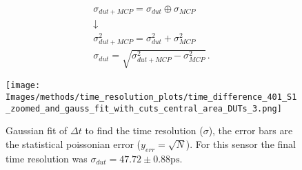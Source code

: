 \begin{equation*}
    \begin{gathered}
    \sigma_{dut+MCP} = \sigma_{dut} \oplus \sigma_{MCP} \\
    \downarrow \\
    \sigma_{dut+MCP}^2 = \sigma_{dut}^2 + \sigma_{MCP}^2 \\
    \sigma_{dut} = \sqrt{\sigma_{dut+MCP}^2-\sigma_{MCP}^2}  \, .
    \end{gathered}
\end{equation*}


\begin{figure}[h!tbp]
    \centering
    \texttt{[image: Images/methods/time\_resolution\_plots/time\_difference\_401\_S1\_zoomed\_and\_gauss\_fit\_with\_cuts\_central\_area\_DUTs\_3.png]}
    \captionsetup{width=\captionwidth}
    \caption{Gaussian fit of \(\Delta t\) to find the time resolution (\(\sigma\)), the error bars are the statistical poissonian error (\(y_{err}=\sqrt{N}\)). For this sensor the final time resolution was \(\sigma_{dut} = 47.72\pm0.88\si{\ps} \).}
    \label{fig:time_resolution_plot}
\end{figure}


